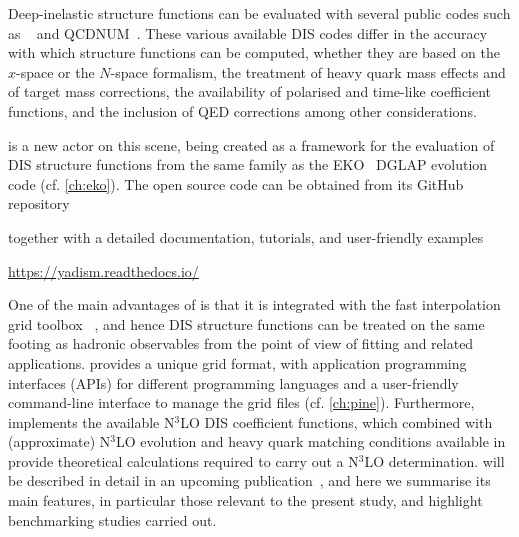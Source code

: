 
Deep-inelastic structure functions can be evaluated with several public codes
such as \apfel~\cite{Bertone:2013vaa} and \textsc{\small
QCDNUM}~\cite{Botje:2010ay}.
%
These various available DIS codes differ in the accuracy with which structure
functions can be computed, whether they are based on the $x$-space or the
$N$-space formalism, the treatment of heavy quark mass effects and of target
mass corrections, the availability of polarised and time-like coefficient
functions, and the inclusion of QED corrections among  other considerations.

\yadism is a new actor on this scene, being created as a framework for the
evaluation of DIS structure functions from the same family as the
\textsc{\small EKO}~\cite{Candido:2022tld} DGLAP evolution code (cf.
\cref{ch:eko}).
%
The open source \yadism code can be obtained from its GitHub repository
\begin{center}
\end{center}  
together with a detailed documentation, tutorials, and user-friendly examples
\begin{center}
  \url{https://yadism.readthedocs.io/}
\end{center}  
One of the main advantages of \yadism is that it is integrated with the fast
interpolation grid toolbox \pineappl~\cite{Carrazza:2020gss},
and hence DIS structure functions can be treated on the same footing as
hadronic observables from the point of view of \pdf{} fitting and related
applications.
%
\pineappl provides a unique grid format, with application programming
interfaces (APIs) for different programming languages and a user-friendly
command-line interface to manage the grid files (cf. \cref{ch:pine}).
%
Furthermore, \yadism implements the available N$^3$LO DIS coefficient
functions, which combined with (approximate)  N$^3$LO evolution and heavy quark
matching conditions available in \eko provide theoretical
calculations required to carry out a N$^3$LO \pdf{} determination.
%
\yadism will be described in detail in an upcoming publication~\cite{yadism},
and here we summarise its main features, in particular those relevant to the
present study, and highlight benchmarking studies carried out.

